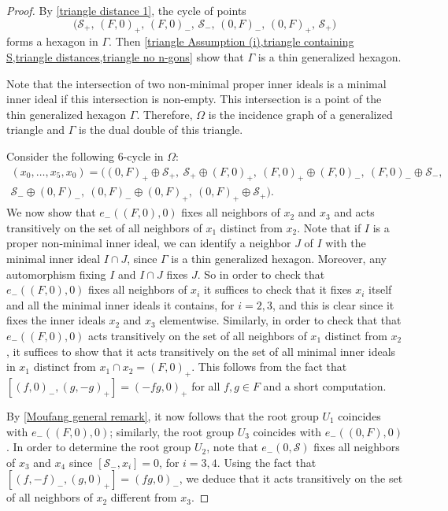 \documentclass[oneside,a4paper]{amsart} %
\theoremstyle{definition}
\renewcommand{\SS}{\mathcal{S}}
\numberwithin{equation}{section}
\begin{document}
\begin{proof}
	By \cref{triangle distance 1}, the cycle of points
	\[ \bigl( \SS_+, \, (F,0)_+, \, (F,0)_-, \, \SS_-, \, (0,F)_-, \, (0,F)_+, \, \SS_+ \bigr) \]
	forms a hexagon in $\Gamma$.
	Then \cref{triangle Assumption (i),triangle containing S,triangle distances,triangle no n-gons} show that $\Gamma$ is a thin generalized hexagon.
	
	Note that the intersection of two non-minimal proper inner ideals is a minimal inner ideal if this intersection is non-empty. This intersection is a point of the thin generalized hexagon $\Gamma$.
	Therefore, $\Omega$ is the incidence graph of a generalized triangle and $\Gamma$ is the dual double of this triangle.
	
	
	Consider the following $6$-cycle in $\Omega$:
	\begin{multline*} 
		(x_0,\dots,x_5,x_0) = \bigl( (0,F)_+\oplus \SS_+, \ \SS_+ \oplus (F,0)_+, \ (F,0)_+\oplus (F,0)_-, \ (F,0)_-\oplus \SS_-,\\
		  \SS_-\oplus (0,F)_-, \ (0,F)_-\oplus (0,F)_+, \ (0,F)_+\oplus \SS_+ \bigr) .
	\end{multline*}
	We now show that $e_-((F,0),0)$ fixes all neighbors of $x_2$ and $x_3$ and acts transitively on the set of all neighbors of $x_1$ distinct from $x_2$.
	Note that if $I$ is a proper non-minimal inner ideal, we can identify a neighbor $J$ of $I$ with the minimal inner ideal $I\cap J$, since $\Gamma$ is a thin generalized hexagon.
	Moreover, any automorphism fixing $I$ and $I\cap J$ fixes $J$.
	So in order to check that $e_-((F,0),0)$ fixes all neighbors of $x_i$ it suffices to check that it fixes $x_i$ itself and all the minimal inner ideals it contains, for $i=2,3$, and this is
	clear since it fixes the inner ideals $x_2$ and $x_3$ elementwise.
	Similarly, in order to check that that $e_-((F,0),0)$ acts transitively on the set of all neighbors of $x_1$ distinct from $x_2$, it suffices to show that it acts transitively on the set of all minimal inner ideals in $x_1$ distinct from ${x_1}\cap {x_2}=(F,0)_+$.
	This follows from the fact that $[(f,0)_-,(g,-g)_+]=(-fg,0)_+$ for all $f,g \in F$ and a short computation.
	
	
	By \cref{Moufang general remark}, it now follows that the root group $U_1$ coincides with $e_-((F,0),0)$;
	similarly, the root group $U_3$ coincides with $e_-((0,F),0)$.
	In order to determine the root group $U_2$, note that $e_-(0,\SS)$ fixes all neighbors of $x_3$ and $x_4$ since $[\SS_-,x_i]=0$, for $i=3,4$.
	Using the fact that $[(f,-f)_-,(g,0)_+]=(fg,0)_-$, we deduce that it acts transitively on the set of all neighbors of $x_2$ different from $x_3$. 
	

\end{proof}
\end{document}

